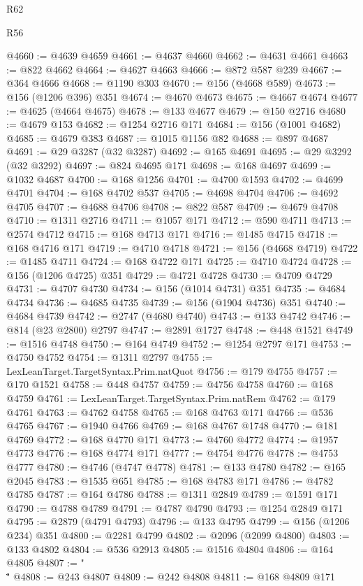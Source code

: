 \begin{lexlean}{R62}
\begin{lexlean}{R56}
\begin{coremodule}
{{{{{{{{{{{{{{{{{{{{{{{{{{{{{{{{{{{{{{{{{{{{{{{{{{{{{{{{{{{{{{{{{{{{{{{{{{{{{{{{{{{{{{{{{{{{{{{{{{{{{{{{{{{{{{{{{{{{{{{{{{{{{{{{{{{{{{{{{{{{{{{{{{{{{{{{{{{{{{{{{{{{{{{{{{{{{{{{{{{{{{{{{{{{{{{{{{{{{{{{{{{{{{{{{{{@4660 := @4639 @4659
@4661 := @4637 @4660
@4662 := @4631 @4661
@4663 := @822 @4662
@4664 := @4627 @4663
@4666 := @872 @587 @239
@4667 := @364 @4666
@4668 := @1190 @303
@4670 := @156 (@4668 @589)
@4673 := @156 (@1206 @396) @351
@4674 := @4670 @4673
@4675 := @4667 @4674
@4677 := @4625 (@4664 @4675)
@4678 := @133 @4677
@4679 := @150 @2716
@4680 := @4679 @153
@4682 := @1254 @2716 @171
@4684 := @156 (@1001 @4682)
@4685 := @4679 @383
@4687 := @1015 @1156 @82
@4688 := @897 @4687
@4691 := @29 @3287 (@32 @3287)
@4692 := @165 @4691
@4695 := @29 @3292 (@32 @3292)
@4697 := @824 @4695 @171
@4698 := @168 @4697
@4699 := @1032 @4687
@4700 := @168 @1256
@4701 := @4700 @1593
@4702 := @4699 @4701
@4704 := @168 @4702 @537
@4705 := @4698 @4704
@4706 := @4692 @4705
@4707 := @4688 @4706
@4708 := @822 @587
@4709 := @4679 @4708
@4710 := @1311 @2716
@4711 := @1057 @171
@4712 := @590 @4711
@4713 := @2574 @4712
@4715 := @168 @4713 @171
@4716 := @1485 @4715
@4718 := @168 @4716 @171
@4719 := @4710 @4718
@4721 := @156 (@4668 @4719)
@4722 := @1485 @4711
@4724 := @168 @4722 @171
@4725 := @4710 @4724
@4728 := @156 (@1206 @4725) @351
@4729 := @4721 @4728
@4730 := @4709 @4729
@4731 := @4707 @4730
@4734 := @156 (@1014 @4731) @351
@4735 := @4684 @4734
@4736 := @4685 @4735
@4739 := @156 (@1904 @4736) @351
@4740 := @4684 @4739
@4742 := @2747 (@4680 @4740)
@4743 := @133 @4742
@4746 := @814 (@23 @2800) @2797
@4747 := @2891 @1727
@4748 := @448 @1521
@4749 := @1516 @4748
@4750 := @164 @4749
@4752 := @1254 @2797 @171
@4753 := @4750 @4752
@4754 := @1311 @2797
@4755 := LexLeanTarget.TargetSyntax.Prim.natQuot
@4756 := @179 @4755
@4757 := @170 @1521
@4758 := @448 @4757
@4759 := @4756 @4758
@4760 := @168 @4759
@4761 := LexLeanTarget.TargetSyntax.Prim.natRem
@4762 := @179 @4761
@4763 := @4762 @4758
@4765 := @168 @4763 @171
@4766 := @536 @4765
@4767 := @1940 @4766
@4769 := @168 @4767 @1748
@4770 := @181 @4769
@4772 := @168 @4770 @171
@4773 := @4760 @4772
@4774 := @1957 @4773
@4776 := @168 @4774 @171
@4777 := @4754 @4776
@4778 := @4753 @4777
@4780 := @4746 (@4747 @4778)
@4781 := @133 @4780
@4782 := @165 @2045
@4783 := @1535 @651
@4785 := @168 @4783 @171
@4786 := @4782 @4785
@4787 := @164 @4786
@4788 := @1311 @2849
@4789 := @1591 @171
@4790 := @4788 @4789
@4791 := @4787 @4790
@4793 := @1254 @2849 @171
@4795 := @2879 (@4791 @4793)
@4796 := @133 @4795
@4799 := @156 (@1206 @234) @351
@4800 := @2281 @4799
@4802 := @2096 (@2099 @4800)
@4803 := @133 @4802
@4804 := @536 @2913
@4805 := @1516 @4804
@4806 := @164 @4805
@4807 := "\\\""
@4808 := @243 @4807
@4809 := @242 @4808
@4811 := @168 @4809 @171
}}}}}}}}}}}}}}}}}}}}}}}}}}}}}}}}}}}}}}}}}}}}}}}}}}}}}}}}}}}}}}}}}}}}}}}}}}}}}}}}}}}}}}}}}}}}}}}}}}}}}}}}}}}}}}}}}}}}}}}}}}}}}}}}}}}}}}}}}}}}}}}}}}}}}}}}}}}}}}}}}}}}}}}}}}}}}}}}}}}}}}}}}}}}}}}}}}}}}}}}}}}}}}}}}}}
\end{coremodule}
\end{lexlean}
\end{lexlean}
